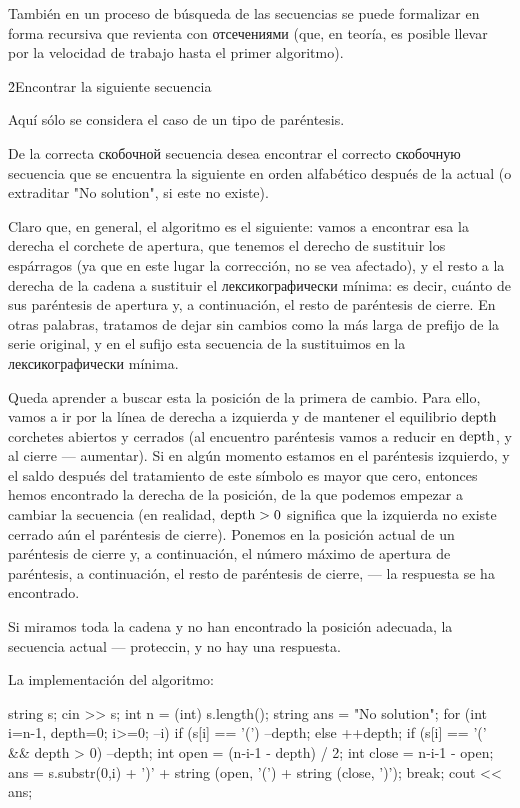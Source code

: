 También en un proceso de búsqueda de las secuencias se puede formalizar en forma recursiva que revienta con отсечениями (que, en teoría, es posible llevar por la velocidad de trabajo hasta el primer algoritmo).


\h2{Encontrar la siguiente secuencia}

Aquí sólo se considera el caso de un tipo de paréntesis.

De la correcta скобочной secuencia desea encontrar el correcto скобочную secuencia que se encuentra la siguiente en orden alfabético después de la actual (o extraditar "No solution", si este no existe).

Claro que, en general, el algoritmo es el siguiente: vamos a encontrar esa la derecha el corchete de apertura, que tenemos el derecho de sustituir los espárragos (ya que en este lugar la corrección, no se vea afectado), y el resto a la derecha de la cadena a sustituir el лексикографически mínima: es decir, cuánto de sus paréntesis de apertura y, a continuación, el resto de paréntesis de cierre. En otras palabras, tratamos de dejar sin cambios como la más larga de prefijo de la serie original, y en el sufijo esta secuencia de la sustituimos en la лексикографически mínima.

Queda aprender a buscar esta la posición de la primera de cambio. Para ello, vamos a ir por la línea de derecha a izquierda y de mantener el equilibrio $\rm depth$ corchetes abiertos y cerrados (al encuentro paréntesis vamos a reducir en $\rm depth$, y al cierre --- aumentar). Si en algún momento estamos en el paréntesis izquierdo, y el saldo después del tratamiento de este símbolo es mayor que cero, entonces hemos encontrado la derecha de la posición, de la que podemos empezar a cambiar la secuencia (en realidad, $\rm depth > 0$ significa que la izquierda no existe cerrado aún el paréntesis de cierre). Ponemos en la posición actual de un paréntesis de cierre y, a continuación, el número máximo de apertura de paréntesis, a continuación, el resto de paréntesis de cierre, --- la respuesta se ha encontrado.

Si miramos toda la cadena y no han encontrado la posición adecuada, la secuencia actual --- proteccin, y no hay una respuesta.

La implementación del algoritmo:

\code
string s;
cin >> s;
int n = (int) s.length();
string ans = "No solution";
for (int i=n-1, depth=0; i>=0; --i) {
if (s[i] == '(')
--depth;
else
++depth;
if (s[i] == '(' && depth > 0) {
--depth;
int open = (n-i-1 - depth) / 2;
int close = n-i-1 - open;
ans = s.substr(0,i) + ')' + string (open, '(') + string (close, ')');
break;
}
}
cout << ans;
\endcode

